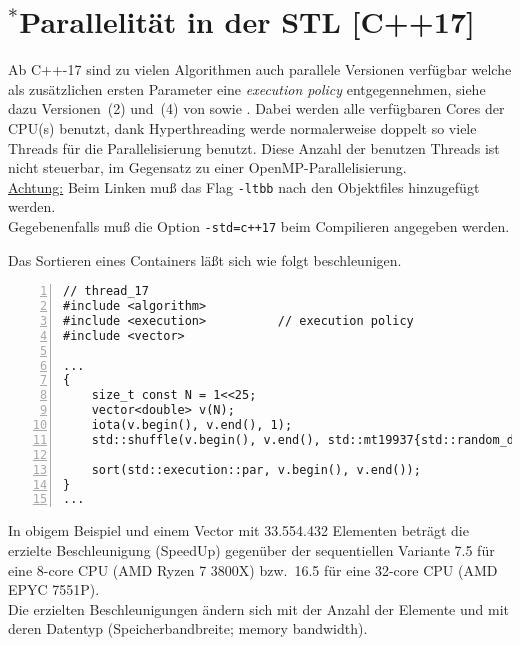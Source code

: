 \section{\mbox{}$^{*}$Parallelität in der STL [C++17]}
\label{p:11.5}
Ab C++-17 sind zu vielen Algorithmen auch parallele Versionen verfügbar 
welche als zusätzlichen ersten Parameter eine \emph{execution policy} entgegennehmen,
siehe dazu Versionen~(2) und~(4) von 
sowie .
Dabei werden alle verfügbaren Cores der CPU(s) benutzt, 
dank Hyperthreading werde normalerweise doppelt so viele Threads für die Parallelisierung benutzt. 
Diese Anzahl der benutzen Threads ist nicht steuerbar, im Gegensatz zu einer OpenMP-Parallelisierung.
\\
\underline{Achtung:} Beim Linken muß das Flag \texttt{-ltbb} nach den Objektfiles hinzugefügt werden.\\
Gegebenenfalls muß die Option \texttt{-std=c++17} beim Compilieren angegeben werden.

Das Sortieren eines Containers läßt sich wie folgt beschleunigen. 
%
\begin{lstlisting}[caption={Paralleles Sortieren},label=lst:par_sort,
basicstyle=\scriptsize,numbers=left, numberstyle=\tiny, stepnumber=2, numbersep=5pt]
// thread_17
#include <algorithm>
#include <execution>          // execution policy
#include <vector>

...
{
    size_t const N = 1<<25;
    vector<double> v(N);
    iota(v.begin(), v.end(), 1);
    std::shuffle(v.begin(), v.end(), std::mt19937{std::random_device{}()});

    sort(std::execution::par, v.begin(), v.end());
}
...
\end{lstlisting}
%
In obigem Beispiel  
und einem Vector mit 33.554.432 Elementen
beträgt die erzielte Beschleunigung (SpeedUp) gegenüber der sequentiellen Variante 7.5 für eine 8-core CPU (AMD Ryzen 7 3800X) 
bzw.\  16.5 für eine 32-core CPU (AMD EPYC 7551P). 
\\
Die erzielten Beschleunigungen ändern sich mit der Anzahl der Elemente 
und mit deren Datentyp (Speicherbandbreite; memory bandwidth). 
%

